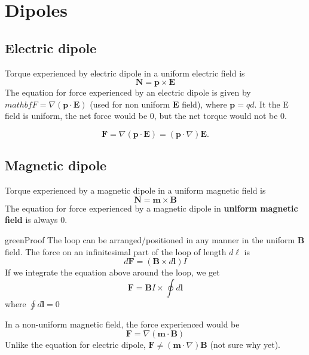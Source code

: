 \section{Dipoles}
\subsection{Electric dipole}
Torque experienced by electric dipole in a uniform electric field is
\begin{equation}
    \mathbf{N}=\mathbf{p} \times \mathbf{E}
\end{equation}
The equation for force experienced by an electric dipole is given by $mathbf{F}=\nabla(\mathbf{p} \cdot \mathbf{E})$ (used for non uniform $\mathbf{E}$ field), where $\mathbf{p}=qd$. It the E field is uniform, the net force would be 0, but the net torque would not be 0.

\begin{equation}
    \mathbf{F}=\nabla(\mathbf{p} \cdot \mathbf{E})=(\mathbf{p} \cdot \nabla)\mathbf{E}.
\end{equation}

\subsection{Magnetic dipole}
Torque experienced by a magnetic dipole in a uniform magnetic field is
\begin{equation}
    \mathbf{N}=\mathbf{m}\times \mathbf{B}
\end{equation}
The equation for force experienced by a magnetic dipole in \textbf{uniform magnetic field} is always 0.
\begin{mybox}{green}{Proof}
    The loop can be arranged/positioned in any manner in the uniform $\mathbf{B}$ field.
    The force on an infinitesimal part of the loop of length $d\ell$ is
    \begin{equation}
        d\mathbf{F}=(\mathbf{B} \times d\mathbf{l})I
    \end{equation}
    If we integrate the equation above around the loop, we get
    \begin{equation}
        \mathbf{F}=\mathbf{B}I\times\oint d\mathbf{l}
    \end{equation}
    where $\oint d\mathbf{l}=0$
\end{mybox}
In a non-uniform magnetic field, the force experienced would be
\begin{equation}
    \mathbf{F}=\nabla(\mathbf{m}\cdot \mathbf{B})
\end{equation}
Unlike the equation for electric dipole, $\mathbf{F} \neq (\mathbf{m}\cdot \nabla)\mathbf{B}$ (not sure why yet).

